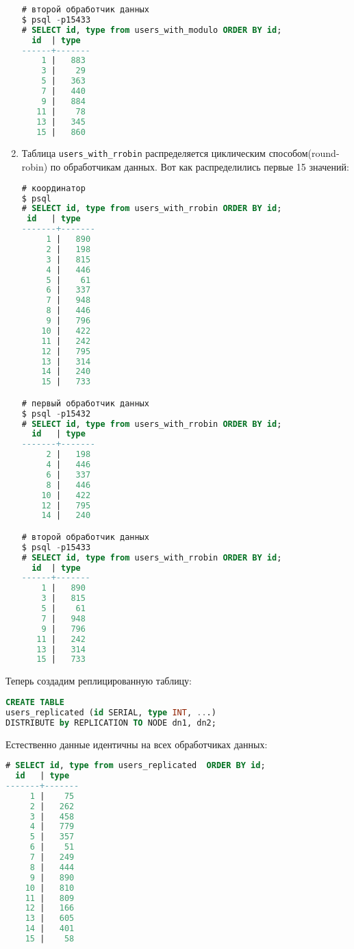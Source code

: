 \begin{enumerate}
\begin{lstlisting}[language=SQL,label=lst:postgres-xc4,caption=Данные с координатора и обработчиков данных]
# второй обработчик данных
$ psql -p15433
# SELECT id, type from users_with_modulo ORDER BY id;
  id  | type
------+-------
    1 |   883
    3 |    29
    5 |   363
    7 |   440
    9 |   884
   11 |    78
   13 |   345
   15 |   860
\end{lstlisting}

  \item Таблица \lstinline!users_with_rrobin! распределяется циклическим способом(round-robin) по обработчикам данных. Вот как распределились первые 15 значений:

\begin{lstlisting}[language=SQL,label=lst:postgres-xc5,caption=Данные с координатора и обработчиков данных]
# координатор
$ psql
# SELECT id, type from users_with_rrobin ORDER BY id;
 id   | type
-------+-------
     1 |   890
     2 |   198
     3 |   815
     4 |   446
     5 |    61
     6 |   337
     7 |   948
     8 |   446
     9 |   796
    10 |   422
    11 |   242
    12 |   795
    13 |   314
    14 |   240
    15 |   733

# первый обработчик данных
$ psql -p15432
# SELECT id, type from users_with_rrobin ORDER BY id;
  id   | type
-------+-------
     2 |   198
     4 |   446
     6 |   337
     8 |   446
    10 |   422
    12 |   795
    14 |   240

# второй обработчик данных
$ psql -p15433
# SELECT id, type from users_with_rrobin ORDER BY id;
  id  | type
------+-------
    1 |   890
    3 |   815
    5 |    61
    7 |   948
    9 |   796
   11 |   242
   13 |   314
   15 |   733
\end{lstlisting}

\end{enumerate}

Теперь создадим реплицированную таблицу:

\begin{lstlisting}[language=SQL,label=lst:postgres-xc20,caption=Создание реплицированной таблицы]
CREATE TABLE
users_replicated (id SERIAL, type INT, ...)
DISTRIBUTE by REPLICATION TO NODE dn1, dn2;
\end{lstlisting}

Естественно данные идентичны на всех обработчиках данных:

\begin{lstlisting}[language=SQL,label=lst:postgres-xc21,caption=Данные с координатора и обработчиков данных]
# SELECT id, type from users_replicated  ORDER BY id;
  id   | type
-------+-------
     1 |    75
     2 |   262
     3 |   458
     4 |   779
     5 |   357
     6 |    51
     7 |   249
     8 |   444
     9 |   890
    10 |   810
    11 |   809
    12 |   166
    13 |   605
    14 |   401
    15 |    58
\end{lstlisting}


